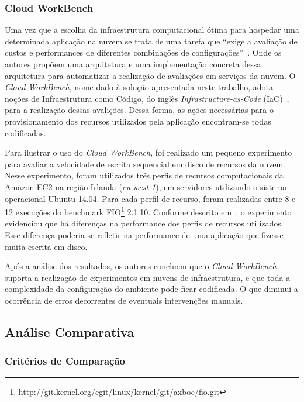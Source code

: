 \subsubsection{Cloud WorkBench}
Uma vez que a escolha da infraestrutura computacional ótima para hospedar uma determinada aplicação na nuvem se trata de uma tarefa que ``exige a avaliação de custos e performances de diferentes combinações de configurações''~\cite{scheuner2014cloud}. Onde os autores propõem uma arquitetura e uma implementação concreta dessa arquitetura para automatizar a realização de avaliações em serviços da nuvem. O {\em Cloud WorkBench}, nome dado à solução apresentada neste trabalho, adota noções de Infraestrutura como Código, do inglês {\em Infrastructure-as-Code} (IaC)~\cite{huttermann2012devops}, para a realização dessas avalições. Dessa forma, as ações necessárias para o provisionamento dos recursos utilizados pela aplicação encontram-se todas codificadas.

Para ilustrar o uso do \textit{Cloud WorkBench}, foi realizado um pequeno experimento para avaliar a velocidade de escrita sequencial em disco de recursos da nuvem. Nesse experimento, foram utilizados três perfis de recursos computacionais da Amazon EC2 na região Irlanda (\textit{eu-west-1}), em servidores utilizando o sistema operacional Ubuntu 14.04. Para cada perfil de recurso, foram realizadas entre 8 e 12 execuções do benchmark FIO\footnote{http://git.kernel.org/cgit/linux/kernel/git/axboe/fio.git} 2.1.10. Conforme descrito em~\cite{scheuner2014cloud}, o experimento evidenciou que há diferenças na performance dos perfis de recursos utilizados. Esse diferença poderia se refletir na performance de uma aplicação que fizesse muita escrita em disco.

Após a análise dos resultados, os autores concluem que o \textit{Cloud WorkBench} suporta a realização de experimentos em nuvens de infraestrutura, e que toda a complexidade da configuração do ambiente pode ficar codificada. O que diminui a ocorrência de erros decorrentes de eventuais intervenções manuais.

\subsection{Análise Comparativa}

\subsubsection{Critérios de Comparação}

